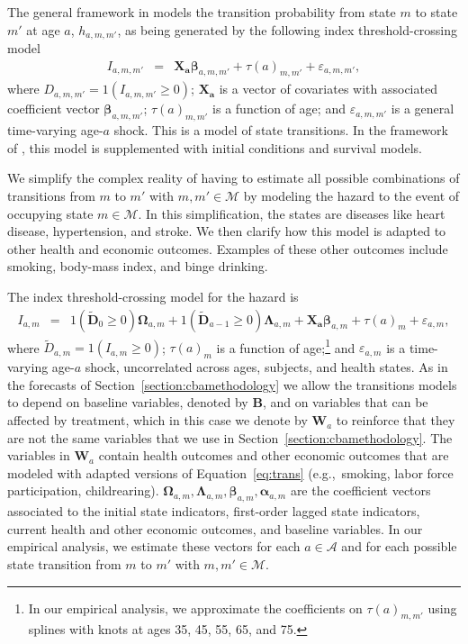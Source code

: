 The general framework in \citet{Heckman_1981_heterogeneity,Heckman_1981_IncidentalParametersProblem} models the transition probability from state $m$ to state $m'$ at age $a$, $h_{a,m,m'}$, as being generated by the following index threshold-crossing model
\begin{eqnarray}
I_{a,m,m'} &=& \bm{X_a} \bm{\beta}_{a,m,m'} + \tau \left( a \right)_{m,m'} + \varepsilon_{a,m,m'}, \label{eq:trans0}
\end{eqnarray}
where $D_{a,m,m'} = \bm{\mathit{1}}  \left( I_{a,m,m'} \geq 0 \right)$; $\bm{X_a}$ is a vector of covariates with associated coefficient vector $ \bm{\beta}_{a,m,m'}$; $\tau \left( a \right)_{m,m'}$ is a function of age; and $\varepsilon_{a,m,m'}$ is a general time-varying age-$a$ shock. This is a model of state transitions. In the framework of  \citet{Heckman_1981_heterogeneity,Heckman_1981_IncidentalParametersProblem}, this model is supplemented with initial conditions and survival models.

We simplify the complex reality of having to estimate all possible combinations of transitions from $m$ to $m'$ with $m,m' \in \mathcal{M}$ by modeling the hazard to the event of occupying state $m \in \mathcal{M}$. In this simplification, the states are diseases like heart disease, hypertension, and stroke. We then clarify how this model is adapted to other health and economic outcomes. Examples of these other outcomes include smoking, body-mass index, and binge drinking.

The index threshold-crossing model for the hazard is 
\begin{eqnarray}
I_{a,m} &=&  \bm{\mathit{1}} \left( \tilde{\bm{D}}_{0} \geq 0 \right) \bm{\Omega}_{a,m} + \bm{\mathit{1}} \left( \tilde{\bm{D}}_{a-1} \geq 0\right) \bm{\Lambda}_{a,m} + \bm{X_a} \bm{\beta}_{a,m} + \tau \left( a \right)_{m} + \varepsilon_{a,m}, \label{eq:trans}
\end{eqnarray}
where $\tilde{D}_{a,m} = \bm{\mathit{1}}  \left( I_{a,m} \geq 0 \right)$; $\tau \left( a \right)_{m}$ is a function of age;\footnote{In our empirical analysis, we approximate the coefficients on $\tau \left( a \right)_{m,m'}$ using splines with knots at ages 35, 45, 55, 65, and 75.} and $\varepsilon_{a,m}$ is a time-varying age-$a$ shock, uncorrelated across ages, subjects, and health states. As in the forecasts of Section~\ref{section:cbamethodology} we allow the transitions models to depend on baseline variables, denoted by $\bm{B}$, and on variables that can be affected by treatment, which in this case we denote by $\bm{W}_a$ to reinforce that they are not the same variables that we use in Section~\ref{section:cbamethodology}. The variables in $\bm{W}_a$ contain health outcomes and other economic outcomes that are modeled with adapted versions of Equation~\eqref{eq:trans} (e.g.,\ smoking, labor force participation, childrearing). $ \bm{\Omega}_{a,m},  \bm{\Lambda}_{a,m}, \bm{\beta}_{a,m},  \bm{\alpha}_{a,m}$ are the coefficient vectors associated to the initial state indicators, first-order lagged state indicators, current health and other economic outcomes, and baseline variables. In our empirical analysis, we estimate these vectors for each $a \in \mathcal{A}$ and for each possible state transition from $m$ to $m'$ with $m,m' \in \mathcal{M}$.

